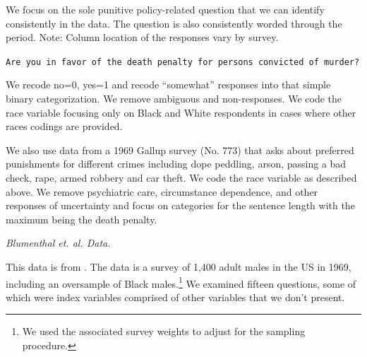 \documentclass[12pt]{article}
\newenvironment{shift}{\begin{adjustwidth}{1cm}{}}{\end{adjustwidth}}
\begin{document}
We focus on the sole punitive policy-related question that we can identify consistently in the data.  The question is also consistently worded through the period.  Note: Column location of the responses vary by survey.

\vspace{.1in}
\begin{shift}
	\vspace{.05in}
	\texttt{Are you in favor of the death penalty for persons convicted of murder? }

\end{shift}

We recode no=0, yes=1 and recode ``somewhat'' responses into that simple binary categorization.  We remove ambiguous and non-responses.  We code the race variable focusing only on Black and White respondents in cases where other races codings are provided.

We also use data from a 1969 Gallup survey (No. 773) that asks about preferred punishments for different crimes including dope peddling, arson, passing a bad check, rape, armed robbery and car theft.  We code the race variable as described above.  We remove psychiatric care, circumstance dependence, and other responses of uncertainty and focus on categories for the sentence length with the maximum being the death penalty.




\vspace{.25in}
\emph{Blumenthal et. al. Data.}

This data is from .  The data is a survey of 1,400 adult males in the US in 1969, including an oversample of Black males.\footnote{We used the associated survey weights to adjust for the sampling procedure.}  We examined fifteen questions, some of which were index variables comprised of other variables that we don't present.
\end{document}
